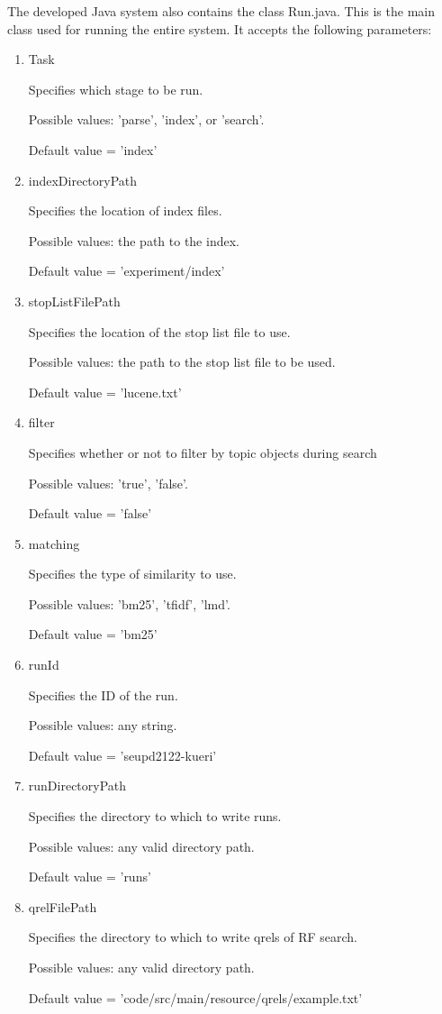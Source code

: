 The developed Java system also contains the class Run.java. This is the main class used for running the entire system. It accepts the following parameters: 

    \begin{enumerate}
        \item Task
            
            Specifies which stage to be run.
            
            Possible values: 'parse', 'index', or 'search'.
    
            Default value = 'index'
        \item indexDirectoryPath
            
            Specifies the location of index files.
            
            Possible values: the path to the index.
            
            Default value = 'experiment/index'
        \item stopListFilePath
            
            Specifies the location of the stop list file to use.
        
            Possible values: the path to the stop list file to be used.
            
            Default value = 'lucene.txt'
        \item filter
            
            Specifies whether or not to filter by topic objects during search
            
            Possible values: 'true', 'false'.
            
            Default value = 'false'
        \item matching
            
            Specifies the type of similarity to use.
            
            Possible values: 'bm25', 'tfidf', 'lmd'.
            
            Default value = 'bm25'
        \item runId
            
            Specifies the ID of the run.
            
            Possible values: any string.
            
            Default value = 'seupd2122-kueri'
        \item runDirectoryPath
            
            Specifies the directory  to which to write runs.
            
            Possible values: any valid directory path.
            
            Default value = 'runs'
        \item qrelFilePath
            
            Specifies the directory to which to write qrels of RF search.
            
            Possible values: any valid directory path.
            
            Default value = 'code/src/main/resource/qrels/example.txt'
    \end{enumerate}

